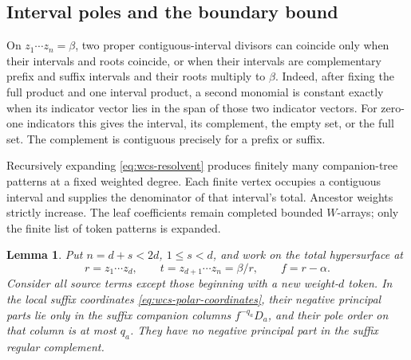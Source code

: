 \documentclass[11pt]{article}
\newtheorem{lemma}[theorem]{Lemma}
\theoremstyle{definition}\newtheorem{definition}[theorem]{Definition}
\begin{document}
\subsection{Interval poles and the boundary bound}

On \(z_1\cdots z_n=\beta\), two proper contiguous-interval
divisors can coincide only when their intervals and roots
coincide, or when their intervals are complementary prefix
and suffix intervals and their roots multiply to \(\beta\).
Indeed, after fixing the full product and one interval product,
a second monomial is constant exactly when its indicator vector
lies in the span of those two indicator vectors.  For zero-one
indicators this gives the interval, its complement, the empty
set, or the full set.  The complement is contiguous precisely
for a prefix or suffix.

Recursively expanding \eqref{eq:wcs-resolvent} produces finitely
many companion-tree patterns at a fixed weighted degree.
Each finite vertex occupies a contiguous interval and supplies
the denominator of that interval's total.  Ancestor weights
strictly increase.  The leaf coefficients remain completed
bounded \(W\)-arrays; only the finite list of token patterns
is expanded.

\begin{lemma}\label{lem:wcs-boundary-bound}
Put \(n=d+s<2d\), \(1\leq s<d\), and work on the total
hypersurface at
\[
 r=z_1\cdots z_d,\qquad t=z_{d+1}\cdots z_n=\beta/r,
 \qquad f=r-\alpha.
\]
Consider all source terms except those beginning with a new
weight-\(d\) token.  In the local suffix coordinates
\eqref{eq:wcs-polar-coordinates}, their negative principal
parts lie only in the suffix companion columns
\(f^{-q_a}D_a\), and their pole order on that column is at
most \(q_a\).  They have no negative principal part in
the suffix regular complement.
\end{lemma}
\end{document}
